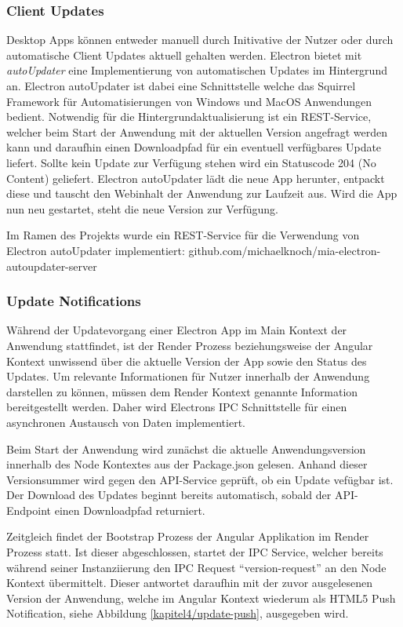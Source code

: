 \subsubsection{Client Updates}

Desktop Apps können entweder manuell durch Initivative der Nutzer oder durch
automatische Client Updates aktuell gehalten werden.
Electron bietet mit \emph{autoUpdater} eine Implementierung
von automatischen Updates im Hintergrund an.
Electron autoUpdater ist dabei eine Schnittstelle welche das Squirrel Framework
für Automatisierungen von Windows und MacOS Anwendungen bedient.
Notwendig für die Hintergrundaktualisierung ist ein REST-Service, welcher beim Start der Anwendung mit der
aktuellen Version angefragt werden kann
und daraufhin einen Downloadpfad für ein eventuell verfügbares Update liefert.
Sollte kein Update zur Verfügung stehen wird ein Statuscode 204 (No Content) geliefert.
Electron autoUpdater lädt die neue App herunter, entpackt diese und tauscht den Webinhalt der Anwendung zur Laufzeit aus.
Wird die App nun neu gestartet, steht die neue Version zur Verfügung.

Im Ramen des Projekts \projectname{} wurde ein REST-Service für die
Verwendung von Electron autoUpdater implementiert:
github.com/michaelknoch/mia-electron-autoupdater-server

\subsubsection{Update Notifications}

Während der Updatevorgang einer Electron App im Main Kontext der
Anwendung stattfindet, ist der Render Prozess beziehungsweise der Angular Kontext unwissend über die aktuelle
Version der App sowie den Status des Updates. Um relevante Informationen für Nutzer innerhalb der Anwendung darstellen zu können,
müssen dem Render Kontext genannte Information bereitgestellt werden.
Daher wird Electrons IPC Schnittstelle für einen asynchronen Austausch von Daten implementiert.

Beim Start der Anwendung wird zunächst die aktuelle Anwendungsversion innerhalb des Node Kontextes aus der Package.json gelesen.
Anhand dieser Versionsummer wird gegen den API-Service geprüft, ob ein Update vefügbar ist. Der Download des Updates beginnt bereits automatisch,
sobald der API-Endpoint einen Downloadpfad returniert.

Zeitgleich findet der Bootstrap Prozess der Angular Applikation im Render Prozess statt.
Ist dieser abgeschlossen, startet der IPC Service, welcher bereits während seiner Instanziierung den
IPC Request ``version-request'' an den Node Kontext übermittelt.
Dieser antwortet daraufhin mit der zuvor ausgelesenen Version der Anwendung, welche im Angular Kontext wiederum als HTML5 Push Notification, siehe Abbildung \ref{kapitel4/update-push}, ausgegeben wird.


